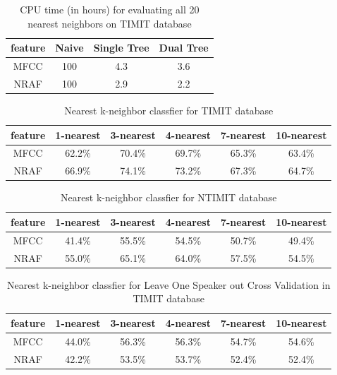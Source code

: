 \documentclass[12pt,letterpaper,doublespaced,ETD,dvips,proposal]{gtthesis}
\begin{document}
\begin{Body}
\begin{table}[h!]
\footnotesize{ \centering
\begin{tabular}{|c|c|c|c|}
  \hline
  feature & Naive & Single Tree & Dual Tree \\
  \hline
  MFCC & 100 & 4.3 & 3.6 \\
  NRAF & 100 & 2.9 & 2.2 \\
  \hline
\end{tabular}
 \caption {CPU time (in hours) for evaluating all 20 nearest neighbors on
  TIMIT database}
  }
  \label{timing}
\end{table}

\begin{table}[htb]
\footnotesize{ \centering
\begin{tabular}{|c|c|c|c|c|c|}
  \hline
  feature & 1-nearest & 3-nearest & 4-nearest & 7-nearest & 10-nearest \\
  \hline
  MFCC & 62.2\% & 70.4\% & 69.7\% & 65.3\% & 63.4\% \\
  NRAF & 66.9\% & 74.1\% & 73.2\% & 67.3\% & 64.7\% \\
  \hline
\end{tabular}
\caption{Nearest k-neighbor classfier for TIMIT database} }
\label{kneighborTIMIT}
\end{table}

\begin{table}[htb]
\footnotesize{ \centering
\begin{tabular}{|c|c|c|c|c|c|}
  \hline
  feature & 1-nearest & 3-nearest & 4-nearest & 7-nearest & 10-nearest \\
  \hline
  MFCC & 41.4\% & 55.5\% & 54.5\% & 50.7\% & 49.4\% \\
  NRAF & 55.0\% & 65.1\% & 64.0\% & 57.5\% & 54.5\% \\
  \hline
\end{tabular}
\caption{Nearest k-neighbor classfier for NTIMIT database} }
\label{kneighborNTIMIT}
\end{table}

\begin{table}[htb]
\footnotesize{ \centering
\begin{tabular}{|c|c|c|c|c|c|}
  \hline
  feature & 1-nearest & 3-nearest & 4-nearest & 7-nearest & 10-nearest \\
  \hline
  MFCC & 44.0\% & 56.3\% & 56.3\% & 54.7\% & 54.6\% \\
  NRAF & 42.2\% & 53.5\% & 53.7\% & 52.4\% & 52.4\% \\
  \hline
\end{tabular}
\caption{Nearest k-neighbor classfier for
  Leave One Speaker out Cross Validation in TIMIT database}
} \label{kneighborLOOCVTIMIT}
\end{table}


\end{Body}
\end{document}

